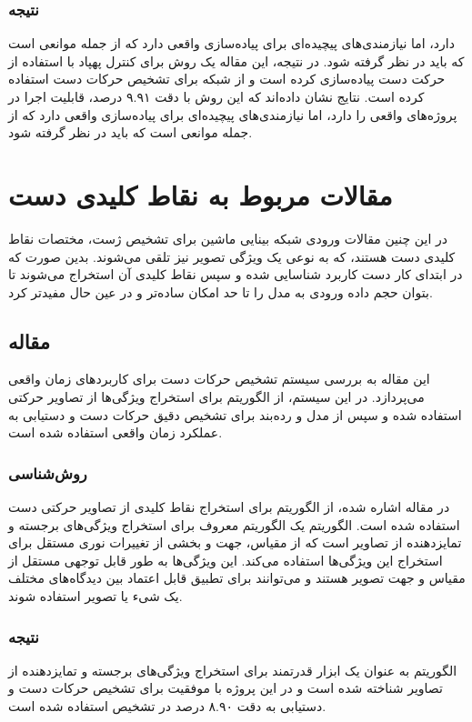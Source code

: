 \subsubsection{نتیجه}
دارد، اما نیازمندی‌های پیچیده‌ای برای پیاده‌سازی واقعی دارد که از جمله موانعی است که باید در نظر گرفته شود.
در نتیجه، این مقاله یک روش برای کنترل پهپاد با استفاده از حرکت دست پیاده‌سازی کرده است و از شبکه 
برای تشخیص حرکات دست استفاده کرده است. نتایج نشان داده‌اند که این روش با دقت ۹.۹۱ درصد، قابلیت اجرا در پروژه‌های واقعی را دارد، اما نیازمندی‌های پیچیده‌ای برای پیاده‌سازی واقعی دارد که از جمله موانعی است که باید در نظر گرفته شود.
\cite{perera2018uav}




\section{مقالات مربوط به نقاط کلیدی دست}
در این چنین مقالات ورودی شبکه بینایی ماشین برای تشخیص ژست، مختصات نقاط کلیدی دست هستند، که به نوعی یک ویژگی تصویر نیز تلقی می‌شوند. بدین صورت که در ابتدای کار دست کاربرد شناسایی شده و سپس نقاط کلیدی آن استخراج می‌شوند تا بتوان حجم داده ورودی به مدل را تا حد امکان ساده‌تر و در عین حال مفیدتر کرد.

\subsection{مقاله }
این مقاله به بررسی سیستم تشخیص حرکات دست برای کاربردهای زمان واقعی می‌پردازد. در این سیستم، از الگوریتم  برای استخراج ویژگی‌ها از تصاویر
حرکتی استفاده شده و سپس از مدل  و رده‌بند  برای تشخیص دقیق حرکات دست و دستیابی به عملکرد زمان واقعی استفاده شده است.

\subsubsection{روش‌شناسی}
در مقاله اشاره شده، از الگوریتم  برای استخراج نقاط کلیدی از تصاویر حرکتی دست استفاده شده است. الگوریتم  یک الگوریتم معروف برای استخراج ویژگی‌های برجسته 
و تمایزدهنده از تصاویر است که از مقیاس، جهت و بخشی از تغییرات نوری مستقل برای استخراج این ویژگی‌ها استفاده می‌کند. این ویژگی‌ها به طور قابل توجهی مستقل از 
مقیاس و جهت تصویر هستند و می‌توانند برای تطبیق قابل اعتماد بین دیدگاه‌های مختلف یک شیء یا تصویر استفاده شوند.

\subsubsection{نتیجه}
الگوریتم  به عنوان یک ابزار قدرتمند برای استخراج ویژگی‌های برجسته و تمایزدهنده از تصاویر شناخته شده است و در این پروژه با موفقیت برای تشخیص حرکات دست و دستیابی به دقت ۸.۹۰ درصد در تشخیص استفاده شده است.


